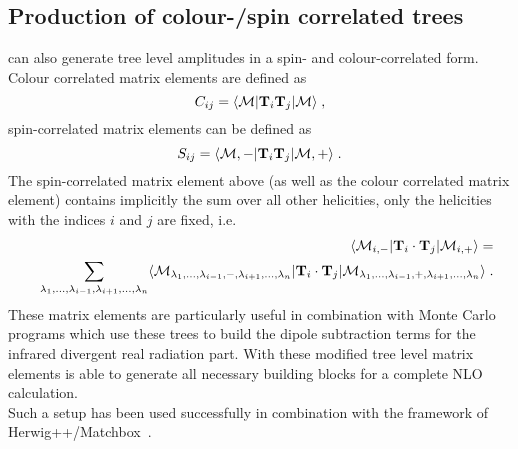 \subsection{Production of colour-/spin correlated trees}

\gosam{} can also generate  tree level amplitudes in a spin- and colour-correlated form.
Colour correlated matrix elements are defined as
\begin{equation}
 C_{ij}=\langle{{\cal M}}|\textbf{T}_{i}\textbf{T}_j |{{\cal M}}\rangle\;,
\end{equation}
spin-correlated matrix elements can be defined as
\begin{equation}
 S_{ij}=\langle{{\cal M},-}|\textbf{T}_{i}\textbf{T}_j |{{\cal M},+}\rangle\;.
\end{equation}
The spin-correlated matrix element above (as well as the colour correlated matrix element) contains implicitly
the sum over all other helicities, only the helicities with the indices $i$ and $j$ are fixed, i.e.
 \begin{eqnarray}
&&\langle {\cal M}_{i,-} |{\mathbf T}_i\cdot {\mathbf T}_j |{\cal M}_{i,+}\rangle =\\
&&\sum_{\lambda_1,...,\lambda_{i-1},\lambda_{i+1},...,\lambda_n}
\langle {\cal M}_{\lambda_1,...,\lambda_{i-1},-,\lambda_{i+1},...,\lambda_n} |
{\mathbf T}_i\cdot {\mathbf T}_j | 
{\cal M}_{\lambda_1,...,\lambda_{i-1},+,\lambda_{i+1},...,\lambda_n}\rangle \;. \nonumber
\end{eqnarray}
These matrix elements are particularly useful in combination with Monte Carlo programs 
which use these trees to build the dipole subtraction terms for the infrared divergent 
real radiation part. With these modified tree level matrix elements \gosam{} is able to generate
all necessary building blocks for a complete NLO calculation.\\
Such a setup has been used successfully in combination with the framework of 
{\sc Herwig++/Matchbox}~\cite{LesHouches2013,Bellm:2013lba,Platzer:2011bc}.
